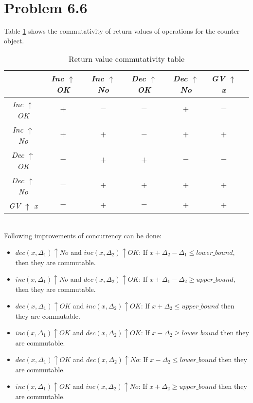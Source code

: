 \documentclass[12pt]{article}
\begin{document}
\section*{Problem 6.6}
Table \ref{tab:ct} shows the commutativity of return values of operations for the counter object.
\begin{table}[h!]
    \centering
    \renewcommand{\arraystretch}{1.3}
    \setlength{\tabcolsep}{10pt}
    \begin{tabular}{|c|c|c|c|c|c|c|}
    \hline
     & \textit{Inc} $\uparrow$ \textit{OK} & \textit{Inc} $\uparrow$ \textit{No} & \textit{Dec} $\uparrow$ \textit{OK} & \textit{Dec} $\uparrow$ \textit{No} & \textit{GV} $\uparrow$ \textit{x} \\
    \hline
    \textit{Inc} $\uparrow$ \textit{OK} & $+$ & $-$ & $-$ & $+$ & $-$ \\
    \textit{Inc} $\uparrow$ \textit{No} & $+$ & $+$ & $-$ & $+$ & $+$ \\
    \textit{Dec} $\uparrow$ \textit{OK} & $-$ & $+$ & $+$ & $-$ & $-$ \\
    \textit{Dec} $\uparrow$ \textit{No} & $-$ & $+$ & $+$ & $+$ & $+$ \\
    \textit{GV} $\uparrow$ \textit{x} & $-$ & $+$ & $-$ & $+$ & $+$ \\
    \hline
    \end{tabular}
    \caption{Return value commutativity table}
    \label{tab:ct}
\end{table}\\
Following improvements of concurrency can be done:
\begin{itemize}
    \item $dec(x, \Delta_1) \uparrow No$ and $inc(x, \Delta_2) \uparrow OK$: If $x + \Delta_2 - \Delta_1 \leq lower\_bound$, then they are commutable.
    \item $inc(x, \Delta_1) \uparrow No$ and $dec(x, \Delta_2) \uparrow OK$: If $x + \Delta_1 - \Delta_2 \geq upper\_bound$, then they are commutable.
    \item $dec(x, \Delta_1) \uparrow OK$ and $inc(x, \Delta_2) \uparrow OK$: If $x + \Delta_2 \leq upper\_bound$ then they are commutable.
    \item $inc(x, \Delta_1) \uparrow OK$ and $dec(x, \Delta_2) \uparrow OK$: If $x - \Delta_2 \geq lower\_bound$ then they are commutable.
    \item $dec(x, \Delta_1) \uparrow OK$ and $dec(x, \Delta_2) \uparrow No$: If $x - \Delta_2 \leq lower\_bound$ then they are commutable.
    \item $inc(x, \Delta_1) \uparrow OK$ and $inc(x, \Delta_2) \uparrow No$: If $x + \Delta_2 \geq upper\_bound$ then they are commutable.
\end{itemize}
\end{document}
